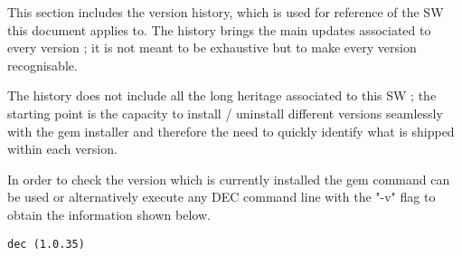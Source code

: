 \documentclass[dec_sum_main.tex]{subfiles}
\begin{document}
 
\par
\noindent
This section includes the version history, which is used for reference of the SW this document applies to. The history brings the main updates associated to every version ; it is not meant to be exhaustive but to make every version recognisable.\newline

\par
\noindent
The history does not include all the long heritage associated to this SW ; the starting point is the capacity to install / uninstall different versions seamlessly with the gem installer and therefore the need to quickly identify what is shipped within each version. \newline

\par
\noindent 
In order to check the version which is currently installed the gem command can be used or alternatively execute any DEC command line with the "-v" flag to obtain the information shown below. \newline


\begin{Verbatim}[tabsize=4]
    dec (1.0.35)
\end{Verbatim}

\end{document}
